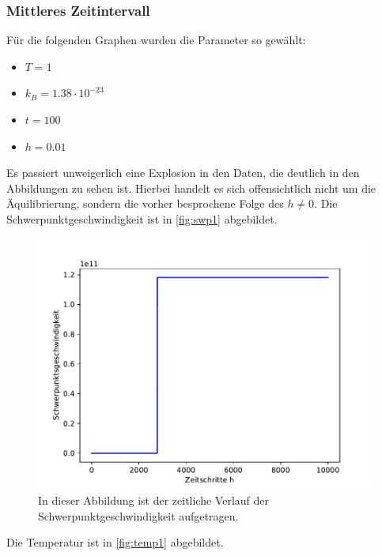 \subsubsection{Mittleres Zeitintervall}
Für die folgenden Graphen wurden die Parameter so gewählt:
\begin{itemize}
    \item $T = 1$
    \item $k_B = 1.38\cdot10^{-23}$
    \item $t = 100$
    \item $h = 0.01$
\end{itemize}
Es passiert unweigerlich eine Explosion in den Daten, die deutlich in den Abbildungen zu sehen ist.
Hierbei handelt es sich offensichtlich nicht um die Äquilibrierung, sondern die vorher besprochene Folge des $h\neq0$.
\newpage
Die Schwerpunktgeschwindigkeit ist in \autoref{fig:swp1} abgebildet.
\begin{figure}[H]
    \centering
    \includegraphics[scale=0.5]{MolDyn/Medium Boy/swp_velocity.pdf}
    \caption{In dieser Abbildung ist der zeitliche Verlauf der Schwerpunktgeschwindigkeit aufgetragen.}
    \label{fig:swp1}
\end{figure}
Die Temperatur ist in \autoref{fig:temp1} abgebildet.

